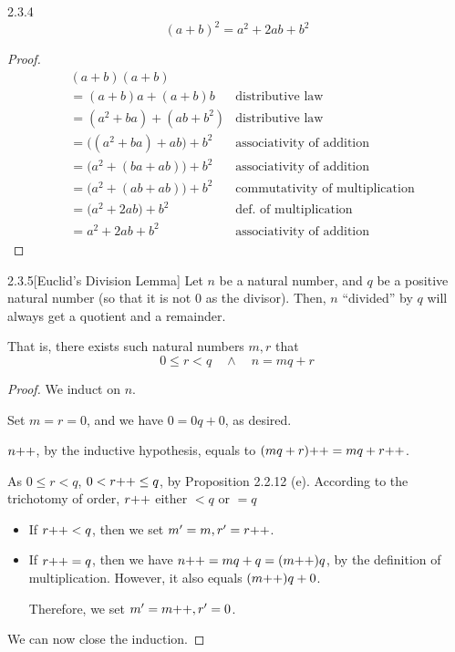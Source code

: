\begin{exercise}{2.3.4}
	\[
		(a+b)^2 = a^2 + 2ab + b^2
	\]
\end{exercise}
\begin{proof}
\begin{align*}
	&(a+b)(a+b) \\
	&= (a+b)a + (a+b)b &\text{distributive law} \\
	&= (a^2 + ba) + (ab + b^2) &\text{distributive law} \\
	&= \bigl((a^2 + ba)+ab\bigr) +b^2 &\text{associativity of addition} \\
	&= \bigl(a^2 + (ba+ab)\bigr) +b^2 &\text{associativity of addition} \\
	&= \bigl(a^2 + (ab+ab)\bigr) +b^2 &\text{commutativity of multiplication} \\
	&= \bigl(a^2 + 2ab\bigr) +b^2 &\text{def.~of multiplication} \\
	&= a^2 + 2ab + b^2 &\text{associativity of addition}
\end{align*}
\end{proof}

\begin{exercise}{2.3.5}[Euclid's Division Lemma]
	Let $n$ be a natural number, and $q$ be a positive natural number (so that it is not 0 as the divisor). Then, $n$ ``divided'' by $q$ will always get a quotient and a remainder.
	
	That is, there exists such natural numbers $m,r$ that 
	\[
	0 \le r < q \quad \wedge \quad n = mq + r
	\]
\end{exercise}
\begin{proof}
	We induct on $n$.
	
	 Set $m = r = 0$, and we have $0 = 0q + 0$, as desired.
	
	 $n{+}{+}$, by the inductive hypothesis, equals to $(mq+r){+}{+} = mq+r{+}{+}$.
	
	As $0 \le r < q$, $0 < r{+}{+} \le q$, by Proposition 2.2.12 (e). According to the trichotomy of order, $r{+}{+}$ either $<q$ or $=q$
	\begin{itemize}
		\item If $r{+}{+}<q$, then we set $m' = m, r' = r{+}{+}$.
		\item If $r{+}{+}=q$, then we have $n{+}{+} = mq + q = (m{+}{+})q$, by the definition of multiplication. However, it also equals $(m{+}{+})q + 0$.
		
		Therefore, we set $m' = m{+}{+}, r' = 0$.
	\end{itemize}

	We can now close the induction.
\end{proof}